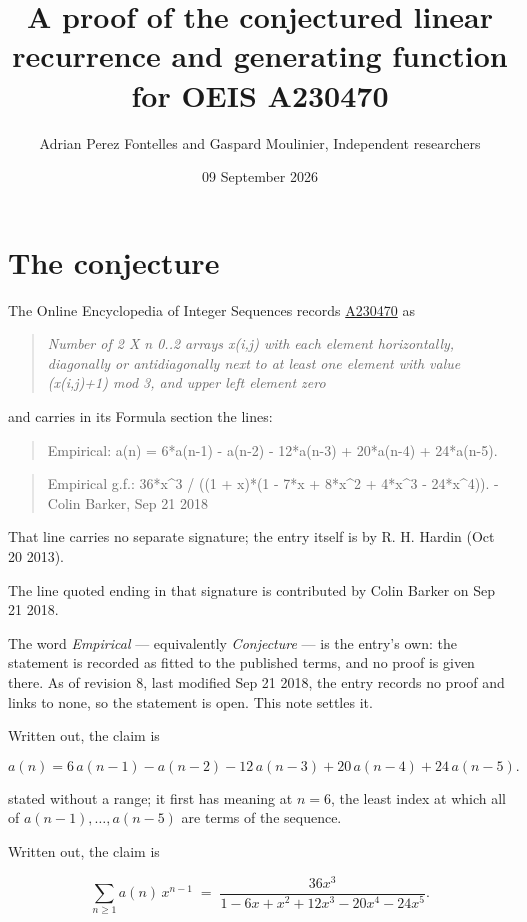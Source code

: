 \documentclass[11pt]{article}
\title{A proof of the conjectured linear recurrence and generating function for OEIS A230470}
\author{Adrian Perez Fontelles and Gaspard Moulinier, Independent researchers}
\date{09 September 2026}
\theoremstyle{definition}
\begin{document}
\maketitle
\section{The conjecture}

The Online Encyclopedia of Integer Sequences records \href{https://oeis.org/A230470}{A230470} as

\begin{quote}\itshape Number of 2 X n 0..2 arrays x(i,j) with each element horizontally, diagonally or antidiagonally next to at least one element with value (x(i,j)+1) mod 3, and upper left element zero\end{quote}

and carries in its Formula section the lines:

\begin{quote}\ttfamily Empirical: a(n) = 6*a(n-1) - a(n-2) - 12*a(n-3) + 20*a(n-4) + 24*a(n-5).\end{quote}

\begin{quote}\ttfamily Empirical g.f.: 36*x\textasciicircum{}3 / ((1 + x)*(1 - 7*x + 8*x\textasciicircum{}2 + 4*x\textasciicircum{}3 - 24*x\textasciicircum{}4)). - Colin Barker, Sep 21 2018\end{quote}

That line carries no separate signature; the entry itself is by R. H. Hardin (Oct 20 2013).

The line quoted ending in that signature is contributed by Colin Barker on Sep 21 2018.

The word {\itshape Empirical} --- equivalently {\itshape Conjecture} --- is the entry's own: the statement is recorded as fitted to the published terms, and no proof is given there. As of revision 8, last modified Sep 21 2018, the entry records no proof and links to none, so the statement is open. This note settles it.

Written out, the claim is

\[a(n) = 6\,a(n-1) - a(n-2) - 12\,a(n-3) + 20\,a(n-4) + 24\,a(n-5).\]

stated without a range; it first has meaning at $n = 6$, the least index at which all of $a(n-1),\dots,a(n-5)$ are terms of the sequence.

Written out, the claim is

\[\sum_{n \ge 1} a(n)\,x^{n-1} \;=\; \frac{36x^{3}}{1 - 6x + x^{2} + 12x^{3} - 20x^{4} - 24x^{5}}.\]
\end{document}
